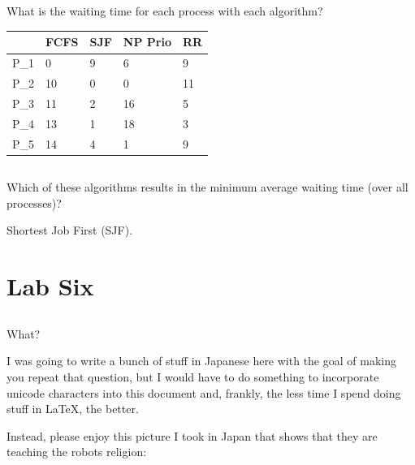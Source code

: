 \documentclass[letterpaper, 10pt,DIV=13]{scrartcl}
\numberwithin{equation}{section} %
\numberwithin{figure}{section} %
\numberwithin{table}{section} %
\begin{document}
\subsection{}
What is the waiting time for each process with each algorithm?

\begin{center}
\begin{tabularx}{\textwidth}{|X|X|X|X|X|}
\hline
& FCFS & SJF & NP Prio & RR \\
\hline
P_1 & 0 & 9 & 6 & 9 \\
\hline
P_2 & 10 & 0 & 0 & 11 \\
\hline
P_3 & 11 & 2 & 16 & 5 \\
\hline
P_4 & 13 & 1 & 18 & 3 \\
\hline
P_5 & 14 & 4 & 1 & 9 \\
\hline
\end{tabularx}
\end{center}

\subsection{}
Which of these algorithms results in the minimum average waiting time (over all processes)?

Shortest Job First (SJF).

\pagebreak

\section{Lab Six}

\subsection{}
What?

I was going to write a bunch of stuff in Japanese here with the goal of making you repeat that question, but I would have to do something to incorporate unicode characters into this document and, frankly, the less time I spend doing stuff in LaTeX, the better.

Instead, please enjoy this picture I took in Japan that shows that they are teaching the robots religion:
\end{document}
